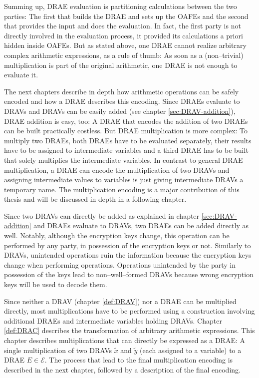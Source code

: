 Summing up, DRAE evaluation is partitioning calculations between the two
parties: The first that builds the DRAE and sets up the OAFEs and the second
that provides the input and does the evaluation. In fact, the first party is not
directly involved in the evaluation process, it provided its calculations a
priori hidden inside OAFEs. But as stated above, one DRAE cannot realize
arbitrary complex arithmetic expressions, as a rule of thumb: As soon as a
(non--trivial) multiplication is part of the original arithmetic, one DRAE is
not enough to evaluate it.

The next chapters describe in depth how arithmetic operations can be safely
encoded and how a DRAE describes this encoding. Since DRAEs evaluate to DRAVs
and DRAVs can be easily added (see chapter \ref{sec:DRAV-addition}), DRAE
addition is easy, too: A DRAE that encodes the addition of two DRAEs can be
built practically costless. But DRAE multiplication is more complex: To multiply
two DRAEs, both DRAEs have to be evaluated separately, their results have to be
assigned to intermediate variables and a third DRAE has to be built that solely
multiplies the intermediate variables. In contrast to general DRAE
multiplication, a DRAE can encode the multiplication of two DRAVs and assigning
intermediate values to variables is just giving intermediate DRAVs a temporary
name. The multiplication encoding is a major contribution of this thesis and
will be discussed in depth in a following chapter.


\label{sec:enc-adds}

Since two DRAVs can directly be added as explained in chapter
\ref{sec:DRAV-addition} and DRAEs evaluate to DRAVs, two DRAEs can be added
directly as well. Notably, although the encryption keys change, this operation
can be performed by any party, in possession of the encryption keys or not.
Similarly to DRAVs, unintended operations ruin the information because the
encryption keys change when performing operations. Operations unintended by the
party in possession of the keys lead to non--well--formed DRAVs because wrong
encryption keys will be used to decode them.


\label{sec:enc-muls}

Since neither a DRAV (chapter \ref{def:DRAV}) nor a DRAE can be multiplied
directly, most multiplications have to be performed using a construction
involving additional DRAEs and intermediate variables holding DRAVs. Chapter
\ref{def:DRAC} describes the transformation of arbitrary arithmetic expressions.
This chapter describes multiplications that can directly be expressed as a DRAE:
A single multiplication of two DRAVs $\widetilde{x}$ and $\widetilde{y}$ (each
assigned to a variable) to a DRAE $E \in \mathcal{E}$. The process that lead to
the final multiplication encoding is described in the next chapter, followed by
a description of the final encoding.


